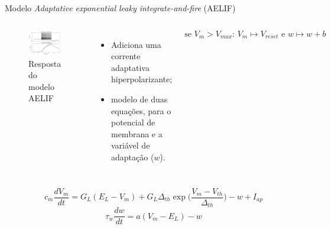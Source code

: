 \begin{frame}{Modelo \textit{Adaptative exponential leaky integrate-and-fire} (AELIF)}
	\begin{columns}[t]
		\column{5cm}
			\begin{figure}[tb]
				\centering
				\caption{Resposta do modelo AELIF}
				\label{fig:adexrs}
				\includegraphics[width=0.8\linewidth]{figs/aelif}
			\end{figure}
		\column{5cm}
		\begin{itemize}
			\item Adiciona uma corrente adaptativa hiperpolarizante;
			\item modelo de duas equações, para o potencial de membrana e a variável de adaptação ($w$).
		\end{itemize}
		\[
			\text{se } V_m > V_{max} \text{: } V_m\mapsto V_{reset} \text{ e } w\mapsto w + b
		\]
	\end{columns}
	\vfill
	\[
	c_m\frac{dV_m}{dt} = G_L(E_L-V_m) + G_L\Delta_{th}\exp\Big(\frac{V_m-V_{th}}{\Delta_{th}}\Big) - w + I_{ap}
	\]\[
	\tau_w\frac{dw}{dt}=a(V_m-E_L)-w
	\]
\end{frame}

